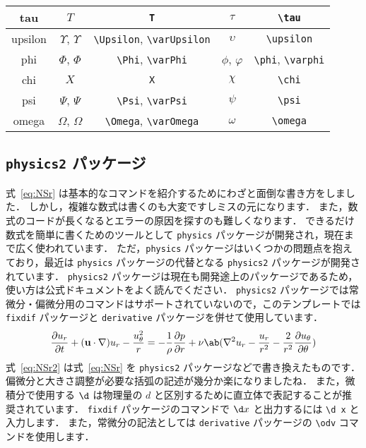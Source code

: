 \begin{table}[tp]
\begin{tabular}{c|c|c|c|c}
        tau & $T$ & \verb|T| & $\tau$ & \verb|\tau| \\ \hline
        upsilon & $\Upsilon$, $\varUpsilon$ & \verb|\Upsilon|, \verb|\varUpsilon| & $\upsilon$ & \verb|\upsilon| \\ \hline
        phi & $\Phi$, $\varPhi$ & \verb|\Phi|, \verb|\varPhi| & $\phi$, $\varphi$ & \verb|\phi|, \verb|\varphi| \\ \hline
        chi & $X$ & \verb|X| & $\chi$ & \verb|\chi| \\ \hline
        psi & $\Psi$, $\varPsi$ & \verb|\Psi|, \verb|\varPsi| & $\psi$ & \verb|\psi| \\ \hline
        omega & $\Omega$, $\varOmega$ & \verb|\Omega|, \verb|\varOmega| & $\omega$ & \verb|\omega| \\ \hline
    \end{tabular}
\end{table}

\subsection{\texttt{physics2} パッケージ}
\label{ssec:physics2}

式~\eqref{eq:NSr} は基本的なコマンドを紹介するためにわざと面倒な書き方をしました．
しかし，複雑な数式は書くのも大変ですしミスの元になります．
また，数式のコードが長くなるとエラーの原因を探すのも難しくなります．
できるだけ数式を簡単に書くためのツールとして \verb|physics| パッケージが開発され，現在まで広く使われています．
ただ，\verb|physics| パッケージはいくつかの問題点を抱えており，最近は \verb|physics| パッケージの代替となる \verb|physics2| パッケージが開発されています．
\verb|physics2| パッケージは現在も開発途上のパッケージであるため，使い方は公式ドキュメントをよく読んでください．
\verb|physics2| パッケージでは常微分・偏微分用のコマンドはサポートされていないので，このテンプレートでは \verb|fixdif| パッケージと \verb|derivative| パッケージを併せて使用しています．
\begin{equation}
    \pdv{u_r}{t} + (\mathbf{u}\cdot\nabla)u_r - \frac{u_\theta^2}{r} = -\frac{1}{\rho}\pdv{p}{r} + \nu\ab(\nabla^2 u_r - \frac{u_r}{r^2} - \frac{2}{r^2}\pdv{u_\theta}{\theta})
    \label{eq:NSr2}
\end{equation}
式~\eqref{eq:NSr2} は式~\eqref{eq:NSr} を \verb|physics2| パッケージなどで書き換えたものです．
偏微分と大きさ調整が必要な括弧の記述が幾分か楽になりましたね．
また，微積分で使用する $\d$ は物理量の $d$ と区別するために直立体で表記することが推奨されています．
\verb|fixdif| パッケージのコマンドで $\d x$ と出力するには \verb|\d x| と入力します．
また，常微分の記法としては \verb|derivative| パッケージの \verb|\odv| コマンドを使用します．

